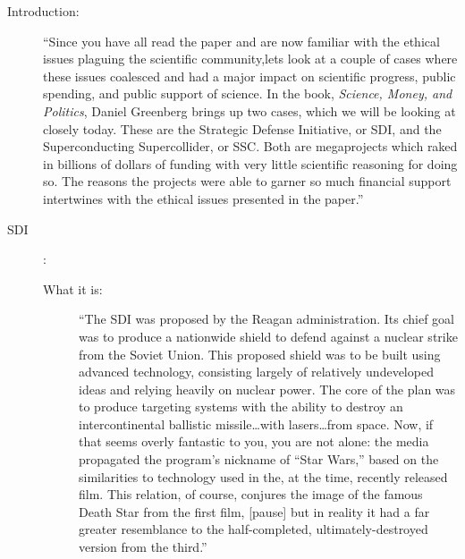 \documentclass[12pt]{article}
\begin{document}
\thispagestyle{fancy}
\vspace*{0.25in}


\begin{description}

  \item[Introduction:] ``Since you have all read the paper and are now familiar
    with the ethical issues plaguing the scientific community,lets look at a
    couple of cases where these issues coalesced and had a major impact on
    scientific progress, public spending, and public support of science. In the
    book, \emph{Science, Money, and Politics}, Daniel Greenberg brings up two
    cases, which we will be looking at closely today. These are the Strategic
    Defense Initiative, or SDI, and the Superconducting Supercollider, or SSC.
    Both are megaprojects which raked in billions of dollars of funding with
    very little scientific reasoning for doing so. The reasons the projects
    were able to garner so much financial support intertwines with the ethical
    issues presented in the paper.''

  \item[SDI]:
    \begin{description}

      \item[What it is:] ``The SDI was proposed by the Reagan administration.
        Its chief goal was to produce a nationwide shield to defend against a
        nuclear strike from the Soviet Union. This proposed shield was to be
        built using advanced technology, consisting largely of relatively
        undeveloped ideas and relying heavily on nuclear power. The core of the
        plan was to produce targeting systems with the ability to destroy an
        intercontinental ballistic missile\ldots with lasers\ldots from space.
        Now, if that seems overly fantastic to you, you are not alone: the
        media propagated the program's nickname of ``Star Wars,'' based on the
        similarities to technology used in the, at the time, recently released
        film. This relation, of course, conjures the image of the famous Death
        Star from the first film, [pause] but in reality it had a far greater
        resemblance to the half-completed, ultimately-destroyed version from
        the third.''


\end{description}
\end{description}
\end{document}
